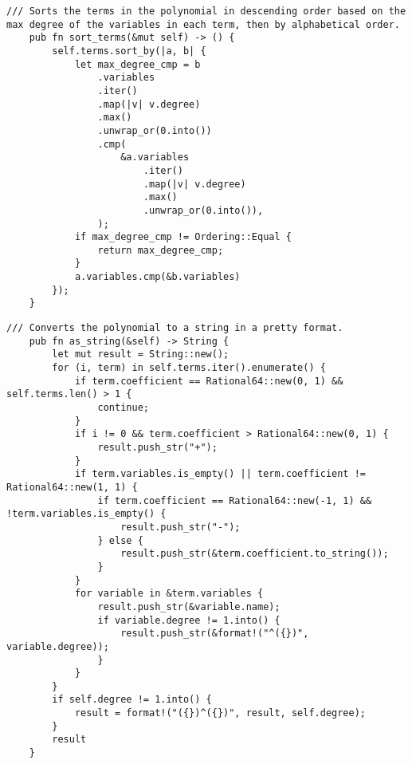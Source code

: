 \begin{lstlisting}[caption={The implementation of the \texttt{sort\_terms()} method for the \texttt{Polynomial} struct}, label={lst:polynomial-sort-terms}]
    /// Sorts the terms in the polynomial in descending order based on the max degree of the variables in each term, then by alphabetical order.
    pub fn sort_terms(&mut self) -> () {
        self.terms.sort_by(|a, b| {
            let max_degree_cmp = b
                .variables
                .iter()
                .map(|v| v.degree)
                .max()
                .unwrap_or(0.into())
                .cmp(
                    &a.variables
                        .iter()
                        .map(|v| v.degree)
                        .max()
                        .unwrap_or(0.into()),
                );
            if max_degree_cmp != Ordering::Equal {
                return max_degree_cmp;
            }
            a.variables.cmp(&b.variables)
        });
    }
\end{lstlisting}

\begin{lstlisting}[caption={The implementation of the \texttt{as\_string()} method for the \texttt{Polynomial} struct}, label={lst:polynomial-as-string}]
    /// Converts the polynomial to a string in a pretty format.
    pub fn as_string(&self) -> String {
        let mut result = String::new();
        for (i, term) in self.terms.iter().enumerate() {
            if term.coefficient == Rational64::new(0, 1) && self.terms.len() > 1 {
                continue;
            }
            if i != 0 && term.coefficient > Rational64::new(0, 1) {
                result.push_str("+");
            }
            if term.variables.is_empty() || term.coefficient != Rational64::new(1, 1) {
                if term.coefficient == Rational64::new(-1, 1) && !term.variables.is_empty() {
                    result.push_str("-");
                } else {
                    result.push_str(&term.coefficient.to_string());
                }
            }
            for variable in &term.variables {
                result.push_str(&variable.name);
                if variable.degree != 1.into() {
                    result.push_str(&format!("^({})", variable.degree));
                }
            }
        }
        if self.degree != 1.into() {
            result = format!("({})^({})", result, self.degree);
        }
        result
    }
\end{lstlisting}

